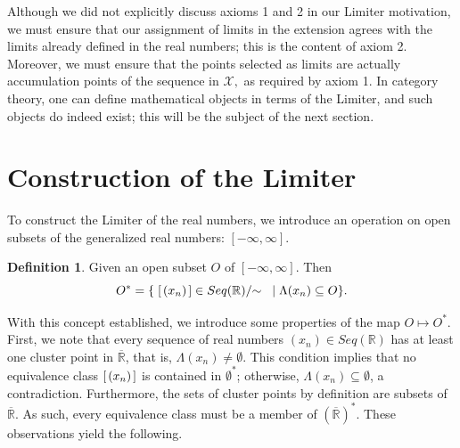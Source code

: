 \documentclass{amsart}
\theoremstyle{definition}
\newtheorem{definition}{Definition}
\theoremstyle{plain}
\begin{document}
Although we did not explicitly discuss axioms 1 and 2 in our Limiter motivation, we must ensure that our assignment of limits in the extension agrees with the limits already defined in the real numbers; this is the content of axiom 2. Moreover, we must ensure that the points selected as limits are actually accumulation points of the sequence in $\mathcal X,$
 as required by axiom 1. In category theory, one can define mathematical objects in terms of the Limiter, and such objects do indeed exist; this will be the subject of the next section.

\section{Construction of the Limiter}

To construct the Limiter of the real numbers, we introduce an operation on open subsets 
of the generalized real numbers: $[-\infty,\infty].$

\begin{definition} 
Given an open subset $O$ of  $[-\infty,\infty]$. Then
$$O^* = \{\hspace{1mm} [\hspace{0.5mm} (x_n) \hspace{0.5mm}] \in Seq(\mathbb{R})/ \hspace{-1mm} \sim \hspace{1mm} \hspace{1mm} | \hspace{1mm} \Lambda(x_n) \subseteq O\}.$$ 

\end{definition}
   
\noindent With this concept established,  we introduce some properties of the map $O \mapsto O^*$. \\

\noindent First, we note that every sequence of real numbers $(x_n) \in Seq(\mathbb{R})$ has at  least one cluster  point in $\overline{\mathbb{R}}$, that is, $\Lambda(x_n)\neq \emptyset. $ This condition implies that no
equivalence class $[\hspace{0.5mm}(x_n)\hspace{0.5mm}]$ is contained in $\emptyset^*$; otherwise,  $ \Lambda(x_n) \subseteq \emptyset$, a contradiction. Furthermore, the sets of cluster points by definition are subsets of $\overline{\mathbb{R}}$. As such, every equivalence class must be a member of $(\overline{\mathbb{R}})^*$. These observations yield the following.\\
\end{document}
